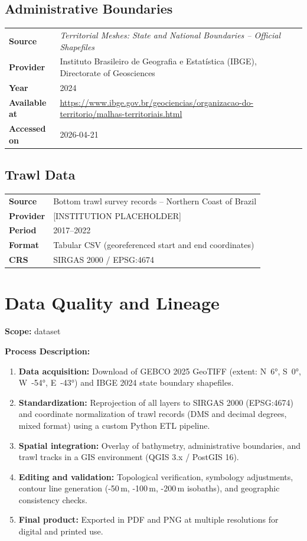 \documentclass[12pt, a4paper]{article}
\begin{document}
\subsection{Administrative Boundaries}
\begin{tabular}{>{\bfseries}p{5cm} p{9cm}}
Source    & \textit{Territorial Meshes: State and National Boundaries -- Official Shapefiles} \\
Provider  & Instituto Brasileiro de Geografia e Estatística (IBGE), Directorate of Geosciences \\
Year      & 2024 \\
Available at & \url{https://www.ibge.gov.br/geociencias/organizacao-do-territorio/malhas-territoriais.html} \\
Accessed on  & 2026-04-21 \\
\end{tabular}

\subsection{Trawl Data}
\begin{tabular}{>{\bfseries}p{5cm} p{9cm}}
Source    & Bottom trawl survey records -- Northern Coast of Brazil \\
Provider  & [INSTITUTION PLACEHOLDER] \\
Period    & 2017--2022 \\
Format    & Tabular CSV (georeferenced start and end coordinates) \\
CRS       & SIRGAS 2000 / EPSG:4674 \\
\end{tabular}

\section{Data Quality and Lineage}

\noindent\textbf{Scope:} dataset

\noindent\textbf{Process Description:}
\begin{enumerate}
    \item \textbf{Data acquisition:} Download of GEBCO 2025 GeoTIFF (extent: N~6°, S~0°, W~-54°, E~-43°) and IBGE 2024 state boundary shapefiles.
    \item \textbf{Standardization:} Reprojection of all layers to SIRGAS 2000 (EPSG:4674) and coordinate normalization of trawl records (DMS and decimal degrees, mixed format) using a custom Python ETL pipeline.
    \item \textbf{Spatial integration:} Overlay of bathymetry, administrative boundaries, and trawl tracks in a GIS environment (QGIS 3.x / PostGIS 16).
    \item \textbf{Editing and validation:} Topological verification, symbology adjustments, contour line generation (-50\,m, -100\,m, -200\,m isobaths), and geographic consistency checks.
    \item \textbf{Final product:} Exported in PDF and PNG at multiple resolutions for digital and printed use.
\end{enumerate}
\end{document}
